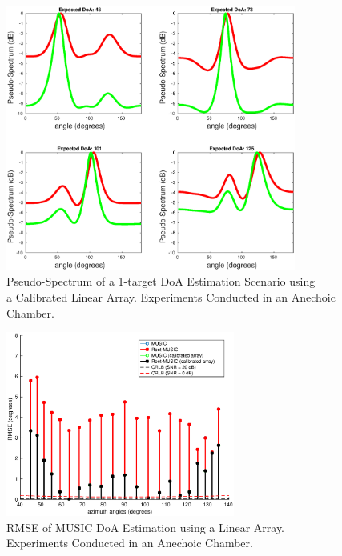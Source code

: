 \documentclass[a4paper, 11pt]{article}
\begin{document}
\begin{figure}[ht!]
    \centering
    \includegraphics[width=0.85\textwidth]{figures/MUSIC_calib_lin_array_X310_1target.eps}
    \caption{Pseudo-Spectrum of a 1-target DoA Estimation Scenario using \\a Calibrated Linear Array. Experiments Conducted in an Anechoic Chamber.}
    \label{music_x310_calib_lin}
\end{figure}
\begin{figure}[hb!]
    \centering
    \includegraphics[width=0.67\textwidth]{figures/rmse_calibrated_array.eps}
    \caption{RMSE of MUSIC DoA Estimation using a Linear Array. \\Experiments Conducted in an Anechoic Chamber.}
    \label{RMSE_music_gr}
\end{figure}
\end{document}
